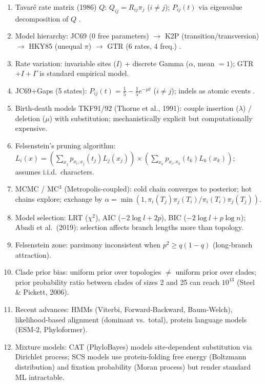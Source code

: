 \clearpage
\begin{revise}\small
\begin{enumerate}[itemsep=0pt, topsep=0pt, parsep=0pt]
    \item Tavaré rate matrix (1986) $Q$: $Q_{ij}=R_{ij}\pi_j$ ($i\neq j$); $P_{ij}(t)$ via eigenvalue decomposition of $Q$ \parencite{tavare1986,yang1994}.
    \item Model hierarchy: JC69 (0 free parameters) $\to$ K2P (transition/transversion) $\to$ HKY85 (unequal $\pi$) $\to$ GTR (6 rates, 4 freq.) \parencite{swofford1996}.
    \item Rate variation: invariable sites ($I$) + discrete Gamma ($\alpha$, mean $=1$); GTR$+I+\Gamma$ is standard empirical model.
    \item JC69+Gaps (5 states): $P_{ij}(t)=\frac{1}{5}-\frac{1}{5}e^{-\mu t}$ ($i\neq j$); indels as atomic events \parencite{wheeler2006}.
    \item Birth-death models TKF91/92 (Thorne et al., 1991): couple insertion ($\lambda$) / deletion ($\mu$) with substitution; mechanistically explicit but computationally expensive.
    \item Felsenstein's pruning algorithm: $L_i(x)=\left(\sum_{x_j}p_{x_i,x_j}(t_j)L_j(x_j)\right)\!\times\!\left(\sum_{x_k}p_{x_i,x_k}(t_k)L_k(x_k)\right)$; assumes i.i.d.\ characters.
    \item MCMC / MC$^3$ (Metropolis-coupled): cold chain converges to posterior; hot chains explore; exchange by $\alpha=\min(1,\pi_i(T_j)\pi_j(T_i)/\pi_i(T_i)\pi_j(T_j))$.
    \item Model selection: LRT ($\chi^2$), AIC ($-2\log l+2p$), BIC ($-2\log l+p\log n$); Abadi et al.\ (2019): selection affects branch lengths more than topology.
    \item Felsenstein zone: parsimony inconsistent when $p^2\geq q(1-q)$ (long-branch attraction).
    \item Clade prior bias: uniform prior over topologies $\neq$ uniform prior over clades; prior probability ratio between clades of sizes 2 and 25 can reach $10^{13}$ (Steel \& Pickett, 2006).
    \item Recent advances: HMMs (Viterbi, Forward-Backward, Baum-Welch), likelihood-based alignment (dominant vs.\ total), protein language models (ESM-2, Phyloformer).
    \item Mixture models: CAT (PhyloBayes) models site-dependent substitution via Dirichlet process; SCS models use protein-folding free energy (Boltzmann distribution) and fixation probability (Moran process) but render standard ML intractable.

\end{enumerate}
\end{revise}
